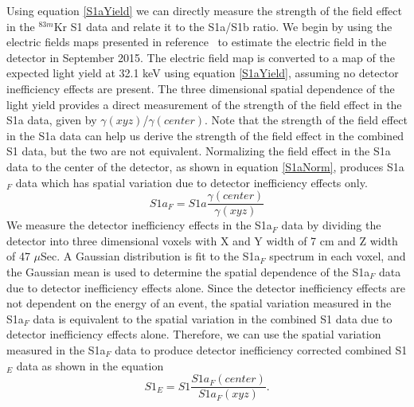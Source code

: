 Using equation \ref{S1aYield} we can directly measure the strength of the field effect in the $^{83m}$Kr S1 data and relate it to the S1a/S1b ratio.  We begin by using the electric fields maps presented in reference~\cite{LuciesMaps} to estimate the electric field in the detector in September 2015.   The electric field map is converted to a map of the expected light yield at 32.1 keV using equation \ref{S1aYield}, assuming no detector inefficiency effects are present. The three dimensional spatial dependence of the light yield provides a direct measurement of the strength of the field effect in the S1a data, given by $\gamma(xyz)$/$\gamma(center)$.  Note that the strength of the field effect in the S1a data can help us derive the strength of the field effect in the combined S1 data, but the two are not equivalent.  Normalizing the field effect in the S1a data to the center of the detector, as shown in equation \ref{S1aNorm}, produces S1a$_F$ data which has spatial variation due to detector inefficiency effects only.  
\begin{equation}
S1a_F = S1a \frac{\gamma(center)}{\gamma(xyz)}
\label{S1aNorm}
\end{equation}
We measure the detector inefficiency effects in the S1a$_F$ data by dividing the detector into three dimensional voxels with X and Y width of 7 cm and Z width of 47 $\mu$Sec.  A Gaussian distribution is fit to the S1a$_F$ spectrum in each voxel, and the Gaussian mean is used to determine the spatial dependence of the S1a$_F$ data due to detector inefficiency effects alone.  Since the detector inefficiency effects are not dependent on the energy of an event, the spatial variation measured in the S1a$_F$ data is equivalent to the spatial variation in the combined S1 data due to detector inefficiency effects alone.  Therefore, we can use the spatial variation measured in the S1a$_F$ data to produce detector inefficiency corrected combined S1$_E$ data as shown in the equation
\begin{equation}
S1_E= S1 \frac{S1a_F(center)}{S1a_F(xyz)}.
\end{equation}
